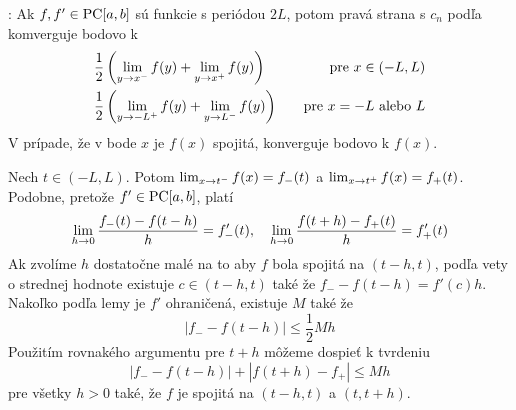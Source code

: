 \begin{veta}
    :
    Ak $f, f' \in \mbox{PC}[a,b]$ sú funkcie s periódou $2L$, potom 
    pravá strana \todo{} s $c_n$ podľa \todo{} komverguje
    bodovo k
    \begin{align*}
        &\frac{1}{2}\left( \lim_{y\rightarrow x^-} f(y) +
                \lim_{y\rightarrow x^+} f(y)\right) \quad &\mbox{pre\ }
                x\in(-L,L) \\
        &\frac{1}{2}\left( \lim_{y\rightarrow -L^+} f(y) +
                \lim_{y\rightarrow L^-} f(y)\right) \quad &\mbox{pre\ }
                x=-L \mbox{\ alebo\ } L            
    \end{align*}
    V prípade, že v bode $x$ je $f(x)$ spojitá, \todo{} konverguje
    bodovo k $f(x)$.
\end{veta}
\begin{dokaz}
    Nech $t \in (-L,L)$. Potom
    $\lim_{x\rightarrow t^-} f(x) = f_-(t)$ a 
    $\lim_{x\rightarrow t^+} f(x) = f_+(t)$.
    Podobne, pretože $f' \in \mbox{PC}[a,b]$, platí
    \begin{equation}
        \lim_{h\rightarrow 0} \frac{f_-(t) - f(t-h)}{h} = f'_-(t), \quad
        \lim_{h\rightarrow 0} \frac{f(t+h)-f_+(t)}{h} = f'_+(t)
    \end{equation}
    Ak zvolíme $h$ dostatočne malé na to aby $f$ bola spojitá na
    $(t-h,t)$, podľa vety o strednej hodnote
    existuje $c \in (t-h,t)$ také že 
    $f_- - f(t-h) = f'(c) h$.
    Nakoľko podľa lemy  je $f'$ ohraničená,
    existuje $M$ také že
    \begin{equation}
        |f_- - f(t-h)| \le \frac{1}{2} M h
    \end{equation}
    Použitím rovnakého argumentu pre $t+h$ môžeme dospieť k tvrdeniu
    \begin{equation}
        |f_- - f(t-h)| + |f(t+h) - f_+| \le Mh
        \label{eq:ft_ohranicenie}
    \end{equation}
    pre všetky $h>0$ také, že $f$ je spojitá na $(t-h,t)$ a $(t,t+h)$.


\end{dokaz}
